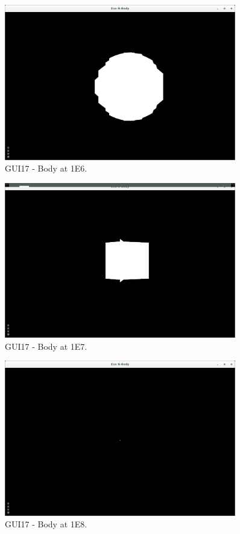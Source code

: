 \begin{figure}[H]
  \centering
  \includegraphics[width=0.9\textwidth]{img/testingEvidence/gui17_1.png}
  \caption{GUI17 - Body at 1E6.}
\end{figure}

\begin{figure}[H]
  \centering
  \includegraphics[width=0.9\textwidth]{img/testingEvidence/gui17_2.png}
  \caption{GUI17 - Body at 1E7.}
\end{figure}

\begin{figure}[H]
  \centering
  \includegraphics[width=0.9\textwidth]{img/testingEvidence/gui17_3.png}
  \caption{GUI17 - Body at 1E8.}
\end{figure}

